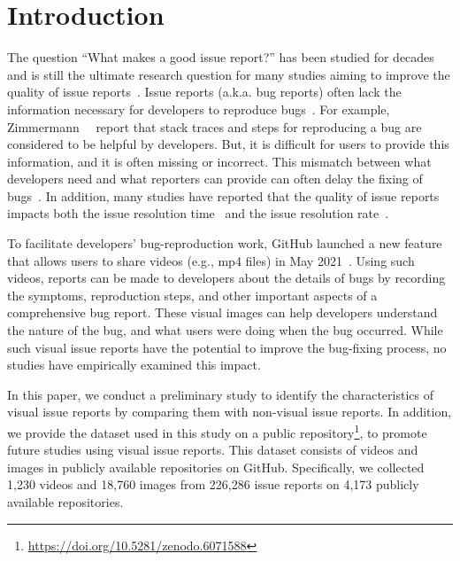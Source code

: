 \section{Introduction}
\label{sec:intro}
The question ``What makes a good issue report?'' has been studied for decades and is still the ultimate research question for many studies aiming to improve the quality of issue reports~\citep{DBLP:conf/icse/HerzigJZ13}\citep{zimmermann2010TSE}\citep{DBLP:conf/eclipse/BettenburgJSWPZ07}. Issue reports (a.k.a. bug reports) often lack the information necessary for developers to reproduce bugs~\citep{DBLP:conf/msr/JoorabchiMM14}\citep{DearGitHub}. 
For example, Zimmermann~\et~\citep{zimmermann2010TSE} report that stack traces and steps for reproducing a bug are considered to be helpful by developers. But, it is difficult for users to provide this information, and it is often missing or incorrect. 
This mismatch between what developers need and what reporters can provide can often delay the fixing of bugs~\citep{DBLP:conf/msr/JoorabchiMM14}. In addition, many studies have reported that the quality of issue reports impacts both the issue resolution time~\citep{DBLP:conf/cscw/BreuPSZ10}\citep{DBLP:conf/icse/GuoZNM10} and the issue resolution rate~\citep{DBLP:conf/compsac/ZouXZCL15}\citep{DBLP:conf/icse/ZimmermannNGM12}. 

To facilitate developers' bug-reproduction work, GitHub launched a new feature that allows users to share videos (e.g., mp4 files) in May 2021~\citep{github-video-blog}. Using such videos, reports can be made to developers about the details of bugs by recording the symptoms, reproduction steps, and other important aspects of a comprehensive bug report. These visual images can help developers understand the nature of the bug, and what users were doing when the bug occurred. While such visual issue reports have the potential to improve the bug-fixing process, no studies have empirically examined this impact. 

In this paper, we conduct a preliminary study to identify the characteristics of visual issue reports by comparing them with non-visual issue reports.  In addition, we provide the dataset used in this study on a public repository\footnote{\url{https://doi.org/10.5281/zenodo.6071588}}, to promote future studies using visual issue reports. This dataset consists of videos and images in publicly available repositories on GitHub. Specifically, we collected 1,230 videos and 18,760 images from 226,286 issue reports on 4,173 publicly available repositories.


